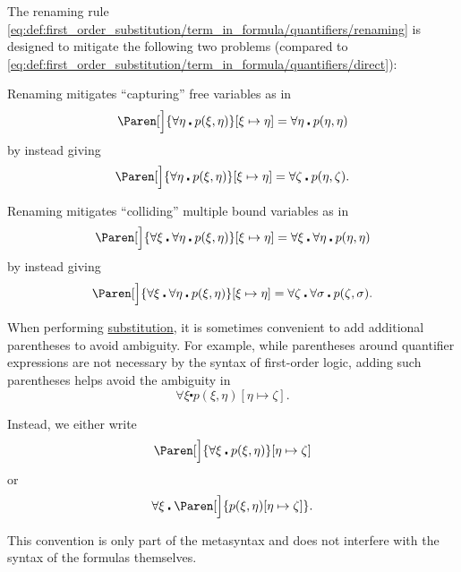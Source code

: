 \begin{remark}\label{rem:first_order_substitution_renaming_justification}
  The renaming rule \eqref{eq:def:first_order_substitution/term_in_formula/quantifiers/renaming} is designed to mitigate the following two problems (compared to \eqref{eq:def:first_order_substitution/term_in_formula/quantifiers/direct}):

  \begin{RemEnum}
     Renaming mitigates \enquote{capturing} free variables as in
    \begin{equation*}
      \Paren[\Big]{ \forall \eta \centerdot p(\xi, \eta) }[\xi \mapsto \eta] = \forall \eta \centerdot p(\eta, \eta)
    \end{equation*}
    by instead giving
    \begin{equation*}
      \Paren[\Big]{ \forall \eta \centerdot p(\xi, \eta) }[\xi \mapsto \eta] = \forall \zeta \centerdot p(\eta, \zeta).
    \end{equation*}

     Renaming mitigates \enquote{colliding} multiple bound variables as in
    \begin{equation*}
      \Paren[\Big]{ \forall \xi \centerdot \forall \eta \centerdot p(\xi, \eta) }[\xi \mapsto \eta] = \forall \xi \centerdot \forall \eta \centerdot p(\eta, \eta)
    \end{equation*}
    by instead giving
    \begin{equation*}
      \Paren[\Big]{ \forall \xi \centerdot \forall \eta \centerdot p(\xi, \eta) }[\xi \mapsto \eta] = \forall \zeta \centerdot \forall \sigma \centerdot p(\zeta, \sigma).
    \end{equation*}
  \end{RemEnum}
\end{remark}

\begin{remark}\label{rem:first_order_substitution_parentheses}
  When performing \hyperref[def:propositional_substitution]{substitution}, it is sometimes convenient to add additional parentheses to avoid ambiguity. For example, while parentheses around quantifier expressions are not necessary by the syntax of first-order logic, adding such parentheses helps avoid the ambiguity in
  \begin{equation*}
    \forall \xi \centerdot p(\xi, \eta) [\eta \mapsto \zeta].
  \end{equation*}

  Instead, we either write
  \begin{equation*}
    \Paren[\Big]{ \forall \xi \centerdot p(\xi, \eta) } [\eta \mapsto \zeta]
  \end{equation*}
  or
  \begin{equation*}
    \forall \xi \centerdot \Paren[\Big]{ p(\xi, \eta)[\eta \mapsto \zeta] }.
  \end{equation*}

  This convention is only part of the metasyntax and does not interfere with the syntax of the formulas themselves.
\end{remark}

